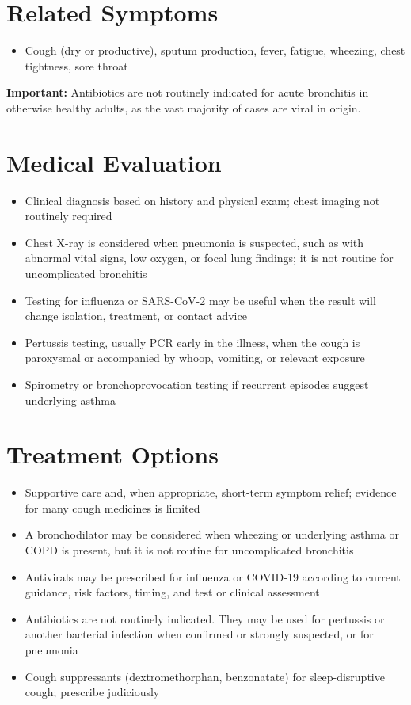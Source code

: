 \section*{Related Symptoms}
\begin{itemize}
 \item Cough (dry or productive), sputum production, fever, fatigue, wheezing, chest tightness, sore throat
\end{itemize}
\textbf{Important:} Antibiotics are not routinely indicated for acute bronchitis in otherwise healthy adults, as the vast majority of cases are viral in origin.

\section*{Medical Evaluation}
\begin{itemize}
 \item Clinical diagnosis based on history and physical exam; chest imaging not routinely required
 \item Chest X-ray is considered when pneumonia is suspected, such as with abnormal vital signs, low oxygen, or focal lung findings; it is not routine for uncomplicated bronchitis
 \item Testing for influenza or SARS-CoV-2 may be useful when the result will change isolation, treatment, or contact advice
 \item Pertussis testing, usually PCR early in the illness, when the cough is paroxysmal or accompanied by whoop, vomiting, or relevant exposure
 \item Spirometry or bronchoprovocation testing if recurrent episodes suggest underlying asthma
\end{itemize}

\section*{Treatment Options}
\begin{itemize}
 \item Supportive care and, when appropriate, short-term symptom relief; evidence for many cough medicines is limited
 \item A bronchodilator may be considered when wheezing or underlying asthma or COPD is present, but it is not routine for uncomplicated bronchitis
 \item Antivirals may be prescribed for influenza or COVID-19 according to current guidance, risk factors, timing, and test or clinical assessment
 \item Antibiotics are not routinely indicated. They may be used for pertussis or another bacterial infection when confirmed or strongly suspected, or for pneumonia
 \item Cough suppressants (dextromethorphan, benzonatate) for sleep-disruptive cough; prescribe judiciously
\end{itemize}

